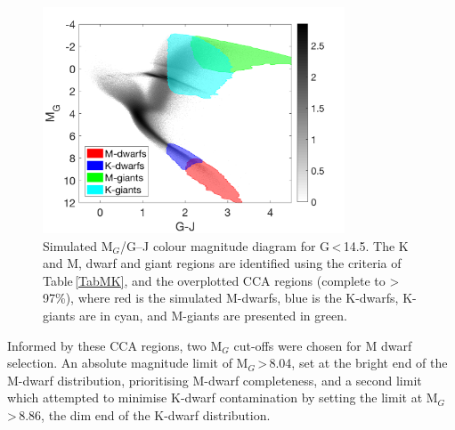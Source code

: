 \begin{figure}
	\centering
    \includegraphics[width=0.8\textwidth]{AbsMag-G.png}
    \caption{Simulated M$_G$/G--J colour magnitude diagram for G\,\textless\,14.5. The K and M, dwarf and giant regions are identified using the criteria of Table\,\ref{TabMK}, and the overplotted CCA regions (complete to \textgreater\,97\%), where red is the simulated M-dwarfs, blue is the K-dwarfs, K-giants are in cyan, and M-giants are presented in green.}
    \label{figColMagA}
\end{figure}

Informed by these CCA regions, two M$_G$ cut-offs were chosen for M dwarf selection. An absolute magnitude limit of M$_G$\,\textgreater\,8.04, set at the bright end of the M-dwarf distribution, prioritising M-dwarf completeness, and a second limit which attempted to minimise K-dwarf contamination by setting the limit at M$_G$\,\textgreater\,8.86, the dim end of the K-dwarf distribution.\\

